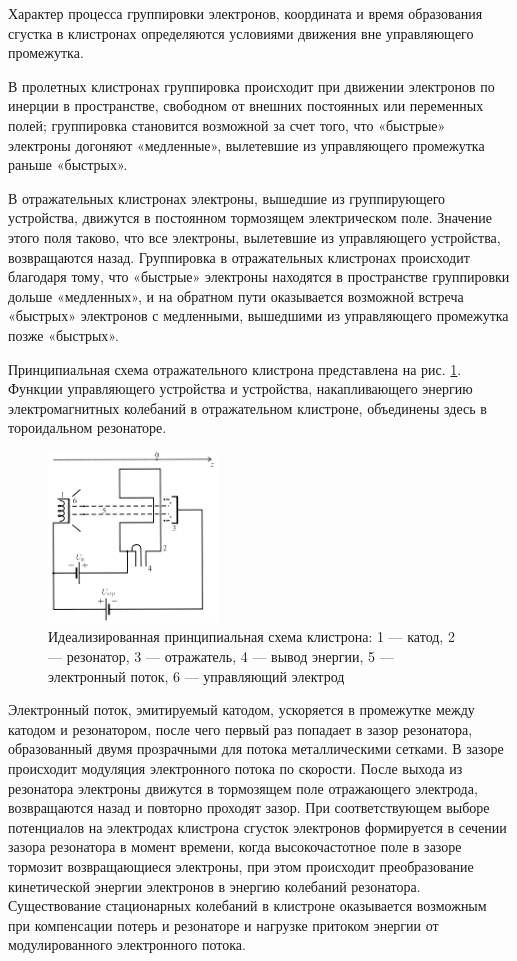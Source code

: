 Характер процесса группировки электронов, координата и время образования сгустка в клистронах определяются условиями движения вне управляющего промежутка.

В пролетных клистронах группировка происходит при движении электронов по инерции в пространстве, свободном от внешних постоянных или переменных полей; группировка становится возможной за счет того, что «быстрые» электроны догоняют «медленные», вылетевшие из управляюще­го промежутка раньше «быстрых».

В отражательных клистронах электроны, вышедшие из группирующего устройства, движутся в постоянном тормозящем электрическом поле. Значение этого поля таково, что все электроны, вылетевшие из управляющего устройства, возвращаются назад. Группировка в отражательных клистронах происходит благодаря тому, что «быстрые» электроны находятся в пространстве группировки дольше «медленных», и на обратном пути оказывается возможной встреча «быстрых» электронов с медленными, вышедшими из управляющего промежутка позже «быстрых».

Принципиальная схема отражательного клистрона представлена на рис. \ref{fig:1}. Функции управляющего устройства и устройства, накапливающего энергию электромагнитных колебаний в отражательном клистроне, объединены здесь в тороидальном резонаторе.

\begin{figure}[h!]
	\centering
	\includegraphics[width=0.4\textwidth]{fig/fig1}
	\caption{Идеализированная принципиальная схема клистрона: 1 — катод, 2 — резонатор, 3 — отражатель, 4 — вывод энергии, 5 — электронный поток, 6 — управляющий электрод}
	\label{fig:1}
\end{figure}

Электронный поток, эмитируемый катодом, ускоряется в промежутке между катодом и резонатором, после чего первый раз попадает в зазор резонатора, образованный двумя прозрачными для потока металлическими сетками. В зазоре происходит модуляция электронного потока по скорости. После выхода из резонатора электроны движутся в тормозящем поле отражающего электрода, возвращаются назад и повторно проходят зазор. При соответствующем выборе потенциалов на электродах клистрона сгусток электронов формируется в сечении зазора резонатора в момент времени, когда высокочастотное поле в зазоре тормозит возвращающиеся электроны, при этом происходит преобразование кинетической энергии электронов в энергию колебаний резонатора. Существование стационарных колебаний в клистроне оказывается возможным при компенсации потерь и резонаторе и нагрузке притоком энергии от модулированного электронного потока.

